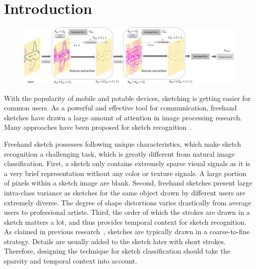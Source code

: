 \section{Introduction}
\label{sec:intro}


 \begin{figure}
 	\center
 	\includegraphics[width=\textwidth]{images/sketchpointnet.png}
 	\label{fig:sketchpointnet}
 \end{figure}


With the popularity of mobile and potable devices, sketching is getting easier for common users. As a powerful and effective tool for communication, freehand sketches have drawn a large amount of attention in image processing research.
Many approaches have been proposed for sketch recognition~\cite{Eitz2012HowDH, LiHSG15, Schneider2014SketchCA, Yu2015SketchaNetTB, Seddati2015DeepSketchDC, Dupont2016DeepSketch2D}.


Freehand sketch possesses following unique characteristics, which make sketch recognition a challenging task, which is greatly different from natural image classification.
%
First, a sketch only contains extremely sparse visual signals as it is a very brief representation without any color or texture signals.
A large portion of pixels within a sketch image are blank.
%
Second, freehand sketches present large intra-class variance as sketches for the same object drawn by different users are extremely diverse.
The degree of shape distortions varies drastically from average users to professional artists.
%
Third, the order of which the strokes are drawn in a sketch matters a lot, and thus provides temporal context for sketch recognition.
As claimed in previous research~\cite{Eitz2012HowDH}, sketches are typically drawn in a coarse-to-fine strategy. 
Details are usually added to the sketch later with short strokes.
Therefore, designing the technique for sketch classification should take the sparsity and temporal context into account.



